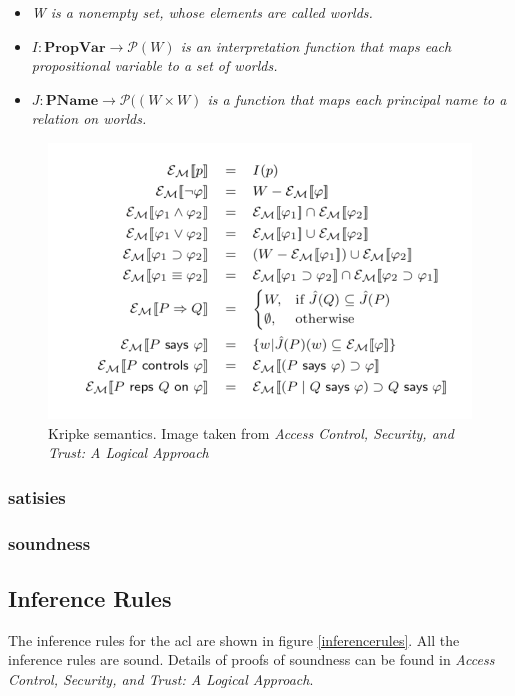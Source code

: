 \documentclass[../../main/main.tex]{subfiles}
\begin{document}
\begin{itemize}
\item \textit{W is a nonempty set, whose elements are called worlds.}
\item \textit{$I: \mathbf{PropVar} \rightarrow \mathcal{P}(W)$ is an interpretation function that maps each propositional variable to a set of worlds.}
\item \textit{$J: \mathbf{PName} \rightarrow \mathcal{P}((W \times W)$ is a function that maps each principal name to a relation on worlds.}
\end{itemize}

\begin{figure}[h]
\centering
\includegraphics{../figures/kripkesemantics}
\caption{\label{kripkesemantics} Kripke semantics. Image taken from \textit{Access Control, Security, and Trust: A Logical Approach}\cite{ChinOlder}}
\end{figure}


\subsubsection{satisies}\label{sssec:satisfies}
\subsubsection{soundness}\label{sssec:soundness}

\subsection{Inference Rules}\label{ssec:inferencerules}
The inference rules for the \gls{acl} are shown in figure \ref{inferencerules}.  All the inference rules are sound.  Details of proofs of soundness can be found in \textit{Access Control, Security, and Trust: A Logical Approach}\cite{ChinOlder}.
\end{document}
